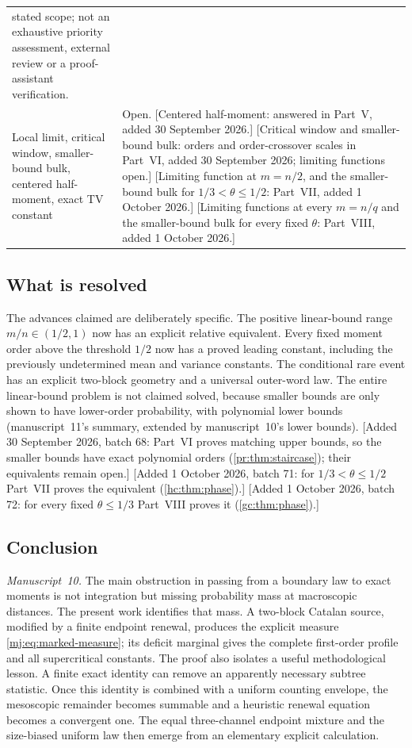 \documentclass[11pt,a4paper]{article}
\theoremstyle{definition}\newaliascnt{definition}{theorem}
\theoremstyle{remark}\newaliascnt{remark}{theorem}
\begin{document}
\begin{table}[htbp]
\begin{tabular}{p{.37\linewidth}p{.56\linewidth}}
 stated scope; not an exhaustive priority assessment, external review or a
 proof-assistant verification.\\
Local limit, critical window, smaller-bound bulk, centered half-moment, exact
 TV constant & Open. [Centered half-moment: answered in
 Part~V, added 30 September 2026.] [Critical window and smaller-bound bulk:
 orders and order-crossover scales in Part~VI, added 30 September 2026;
 limiting functions open.] [Limiting function at $m=n/2$, and the
 smaller-bound bulk for $1/3<\theta\le1/2$: Part~VII, added 1 October
 2026.] [Limiting functions at every $m=n/q$ and the smaller-bound bulk
 for every fixed $\theta$: Part~VIII, added 1 October 2026.]\\
\bottomrule
\end{tabular}
\end{table}

\subsection{What is resolved}
The advances claimed are deliberately specific. The positive linear-bound
range $m/n\in(1/2,1)$ now has an explicit relative equivalent. Every fixed
moment order above the threshold $1/2$ now has a proved leading constant,
including the previously undetermined mean and variance constants. The
conditional rare event has an explicit two-block geometry and a universal
outer-word law. The entire linear-bound problem is not claimed solved,
because smaller bounds are only shown to have lower-order probability, with
polynomial lower bounds (manuscript~11's summary, extended by manuscript~10's
lower bounds). [Added 30 September 2026, batch 68: Part~VI proves matching
upper bounds, so the smaller bounds have exact polynomial orders
(\cref{pr:thm:staircase}); their equivalents remain open.] [Added 1 October
2026, batch 71: for $1/3<\theta\le1/2$ Part~VII proves the equivalent
(\cref{hc:thm:phase}).] [Added 1 October 2026, batch 72: for every fixed
$\theta\le1/3$ Part~VIII proves it (\cref{gc:thm:phase}).]

\subsection{Conclusion}
\emph{Manuscript~10.} The main obstruction in passing from a boundary law to
exact moments is not integration but missing probability mass at macroscopic
distances. The present work identifies that mass. A two-block Catalan
source, modified by a finite endpoint renewal, produces the explicit measure
\eqref{mj:eq:marked-measure}; its deficit marginal gives the complete
first-order profile and all supercritical constants. The proof also isolates
a useful methodological lesson. A finite exact identity can remove an
apparently necessary subtree statistic. Once this identity is combined with a
uniform counting envelope, the mesoscopic remainder becomes summable and a
heuristic renewal equation becomes a convergent one. The equal three-channel
endpoint mixture and the size-biased uniform law then emerge from an
elementary explicit calculation.
\end{document}

